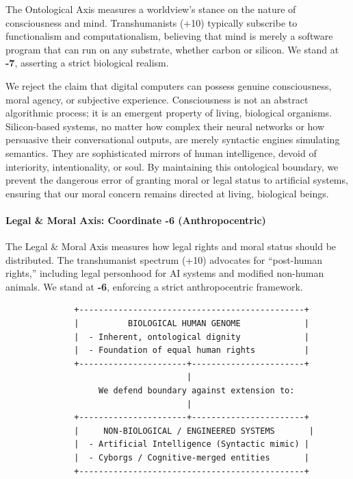 The Ontological Axis measures a worldview's stance on the nature of
consciousness and mind. Transhumanists (+10) typically subscribe to
functionalism and computationalism, believing that mind is merely a
software program that can run on any substrate, whether carbon or
silicon. We stand at \textbf{-7}, asserting a strict biological realism.

We reject the claim that digital computers can possess genuine
consciousness, moral agency, or subjective experience. Consciousness is
not an abstract algorithmic process; it is an emergent property of
living, biological organisms. Silicon-based systems, no matter how
complex their neural networks or how persuasive their conversational
outputs, are merely syntactic engines simulating semantics. They are
sophisticated mirrors of human intelligence, devoid of interiority,
intentionality, or soul. By maintaining this ontological boundary, we
prevent the dangerous error of granting moral or legal status to
artificial systems, ensuring that our moral concern remains directed at
living, biological beings.

\paragraph{Legal \& Moral Axis: Coordinate -6
(Anthropocentric)}\label{legal-moral-axis-coordinate--6-anthropocentric}

The Legal \& Moral Axis measures how legal rights and moral status
should be distributed. The transhumanist spectrum (+10) advocates for
``post-human rights,'' including legal personhood for AI systems and
modified non-human animals. We stand at \textbf{-6}, enforcing a strict
anthropocentric framework.

\begin{verbatim}
              +----------------------------------------------+
              |          BIOLOGICAL HUMAN GENOME             |
              |  - Inherent, ontological dignity             |
              |  - Foundation of equal human rights          |
              +----------------------+-----------------------+
                                     |
                   We defend boundary against extension to:
                                     |
              +----------------------+-----------------------+
              |     NON-BIOLOGICAL / ENGINEERED SYSTEMS       |
              |  - Artificial Intelligence (Syntactic mimic) |
              |  - Cyborgs / Cognitive-merged entities       |
              +----------------------------------------------+
\end{verbatim}

